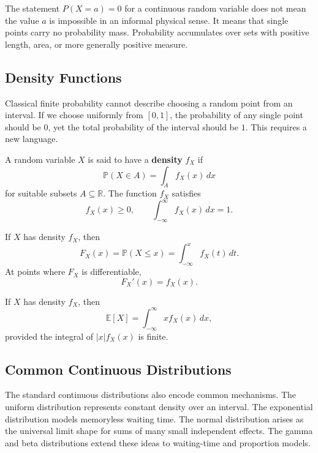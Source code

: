 The statement $P(X=a)=0$ for a continuous random variable does not mean the value $a$ is impossible in an informal physical sense. It means that single points carry no probability mass. Probability accumulates over sets with positive length, area, or more generally positive measure.

\subsection{Density Functions}

Classical finite probability cannot describe choosing a random point from an interval. If we choose uniformly from $[0,1]$, the probability of any single point should be $0$, yet the total probability of the interval should be $1$. This requires a new language.

\begin{definition}
A random variable $X$ is said to have a \textbf{density} $f_X$ if
\[
    \mathbb{P}(X\in A)=\int_A f_X(x)\,dx
\]
for suitable subsets $A\subseteq\mathbb{R}$. The function $f_X$ satisfies
\[
    f_X(x)\geq 0,
    \qquad
    \int_{-\infty}^{\infty}f_X(x)\,dx=1.
\]
\end{definition}

\begin{definition}
If $X$ has density $f_X$, then
\[
    F_X(x)=\mathbb{P}(X\leq x)=\int_{-\infty}^{x}f_X(t)\,dt.
\]
At points where $F_X$ is differentiable,
\[
    F_X'(x)=f_X(x).
\]
\end{definition}

\begin{definition}[Expectation]
If $X$ has density $f_X$, then
\[
    \mathbb{E}[X]=\int_{-\infty}^{\infty}x f_X(x)\,dx,
\]
provided the integral of $|x|f_X(x)$ is finite.
\end{definition}

\subsection{Common Continuous Distributions}


The standard continuous distributions also encode common mechanisms. The uniform distribution represents constant density over an interval. The exponential distribution models memoryless waiting time. The normal distribution arises as the universal limit shape for sums of many small independent effects. The gamma and beta distributions extend these ideas to waiting-time and proportion models.

